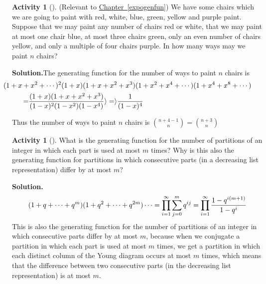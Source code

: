 \documentclass[10pt,]{book}
\theoremstyle{plain}
\theoremstyle{definition}
\newtheorem{activity}[project]{Activity}
\numberwithin{equation}{chapter}
\newcommand{\amp}{&}
\begin{document}
\begin{activity}[]\label{activity-204}
(Relevant to \hyperref[expogenfun]{Chapter~\ref{expogenfun}}) We have some chairs which we are going to paint with red, white, blue, green, yellow and purple paint. Suppose that we may paint any number of chairs red or white, that we may paint at most one chair blue, at most three chairs green, only an even number of chairs yellow, and only a multiple of four chairs purple. In how many ways may we paint \(n\) chairs?%
\par\medskip\noindent%
\textbf{Solution.}\quad The generating function for the number of ways to paint \(n\) chairs is%
\begin{align*}
\amp \hspace{-.5in}(1+x+x^2+\cdots)^2(1+x)(1+x+x^2+x^3)(1+x^2+x^4+\cdots)
(1+x^4+x^8+\cdots)\\
=\amp
\frac{(1+x)(1+x+x^2+x^3)}{(1-x)^2(1-x^2)(1-x^4)}\rangle =\rangle  \frac{1}{(1-x)^4}
\end{align*}
%
\par
Thus the number of ways to paint \(n\) chairs is \(\binom{n+4-1}{n}=\binom{n+3}{n}\)%
\end{activity}
\begin{activity}[]\label{activity-205}
What is the generating function for the number of partitions of an integer in which each part is used at most \(m\) times? Why is this also the generating function for partitions in which consecutive parts (in a decreasing list representation) differ by at most \(m\)?%
\par\medskip\noindent%
\textbf{Solution.}\quad %
\begin{equation*}
(1+q+\cdots+q^m)(1+q^2 +\cdots+q^{2m})\cdots
=\prod_{i=1}^\infty\sum_{j=0}^m q^{ij}\\
=\prod_{i=1}^\infty \frac{1-q^{i(m+1)}}{1-q^i}
\end{equation*}
This is also the generating function for the number of partitions of an integer in which consecutive parts differ by at most \(m\), because when we conjugate a partition in which each part is used at most \(m\) times, we get a partition in which each distinct column of the Young diagram occurs at most \(m\) times, which means that the difference between two consecutive parts (in the decreasing list representation) is at most \(m\).%
\end{activity}
\typeout{************************************************}
\typeout{************************************************}
\end{document}
